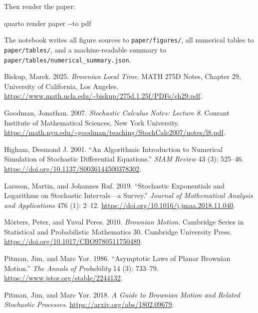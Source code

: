\documentclass[
  english,
  10pt,
  letterpaper,
  DIV=11,
  numbers=noendperiod]{scrartcl}
\newenvironment{Shaded}{\begin{snugshade}}{\end{snugshade}}
\newcommand{\AttributeTok}[1]{\textcolor[rgb]{0.40,0.45,0.13}{#1}}
\newcommand{\ExtensionTok}[1]{\textcolor[rgb]{0.00,0.23,0.31}{#1}}
\newcommand{\NormalTok}[1]{\textcolor[rgb]{0.00,0.23,0.31}{#1}}
\newlength{\cslhangindent}
\newenvironment{CSLReferences}[2] %
 {\begin{list}{}{%
  \setlength{\itemindent}{0pt}
  \setlength{\leftmargin}{0pt}
  \setlength{\parsep}{0pt}
  \ifodd #1
   \setlength{\leftmargin}{\cslhangindent}
   \setlength{\itemindent}{-1\cslhangindent}
  \fi
  \setlength{\itemsep}{#2\baselineskip}}}
 {\end{list}}
\theoremstyle{plain}
\theoremstyle{remark}
\begin{document}
Then render the paper:

\begin{Shaded}
\begin{Highlighting}[]
\ExtensionTok{quarto}\NormalTok{ render paper }\AttributeTok{{-}{-}to}\NormalTok{ pdf}
\end{Highlighting}
\end{Shaded}

The notebook writes all figure sources to \texttt{paper/figures/}, all
numerical tables to \texttt{paper/tables/}, and a machine-readable
summary to \texttt{paper/tables/numerical\_summary.json}.

\protect{}\label{refs}
\begin{CSLReferences}{1}{1}
Biskup, Marek. 2025. \emph{Brownian Local Time}. MATH 275D Notes,
Chapter 29, University of California, Los Angeles.
\url{https://www.math.ucla.edu/~biskup/275d.1.25f/PDFs/ch29.pdf}.

Goodman, Jonathan. 2007. \emph{Stochastic Calculus Notes: Lecture 8}.
Courant Institute of Mathematical Sciences, New York University.
\url{https://math.nyu.edu/~goodman/teaching/StochCalc2007/notes/l8.pdf}.

Higham, Desmond J. 2001. {``An Algorithmic Introduction to Numerical
Simulation of Stochastic Differential Equations.''} \emph{SIAM Review}
43 (3): 525--46. \url{https://doi.org/10.1137/S0036144500378302}.

Larsson, Martin, and Johannes Ruf. 2019. {``Stochastic Exponentials and
Logarithms on Stochastic Intervals---a Survey.''} \emph{Journal of
Mathematical Analysis and Applications} 476 (1): 2--12.
\url{https://doi.org/10.1016/j.jmaa.2018.11.040}.

Mörters, Peter, and Yuval Peres. 2010. \emph{Brownian Motion}. Cambridge
Series in Statistical and Probabilistic Mathematics 30. Cambridge
University Press. \url{https://doi.org/10.1017/CBO9780511750489}.

Pitman, Jim, and Marc Yor. 1986. {``Asymptotic Laws of Planar Brownian
Motion.''} \emph{The Annals of Probability} 14 (3): 733--79.
\url{https://www.jstor.org/stable/2244132}.

Pitman, Jim, and Marc Yor. 2018. \emph{A Guide to Brownian Motion and
Related Stochastic Processes}. \url{https://arxiv.org/abs/1802.09679}.

\end{CSLReferences}
\end{document}
